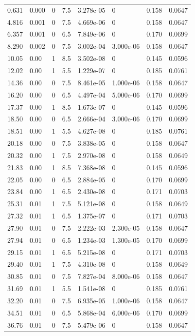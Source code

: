 \documentclass[preview]{standalone}
\begin{document}
{{\begin{tabular}{L{1.2cm}C{1.2cm} C{0.3cm}C{0.5cm} C{1.4cm}C{1.4cm} C{1.4cm}C{1.4cm}}
  0.631  &  0.000  & 0     & 7.5 &  3.278e-05  & 0  & 0.158 &  0.0647   \\ 
  4.816  &  0.001  & 0     & 7.5 &  4.669e-06  & 0  & 0.158 &  0.0647   \\ 
  6.357  &  0.001  & 0     & 6.5 &  7.849e-06  & 0  & 0.170 &  0.0699   \\ 
  8.290  &  0.002  & 0     & 7.5 &  3.002e-04  & 3.000e-06  & 0.158 &  0.0647   \\ 
  10.05  &  0.00  & 1     & 8.5 &  3.502e-08  & 0  & 0.145 &  0.0596   \\ 
  12.02  &  0.00  & 1     & 5.5 &  1.229e-07  & 0  & 0.185 &  0.0761   \\ 
  14.36  &  0.00  & 0     & 7.5 &  8.461e-05  & 1.000e-06  & 0.158 &  0.0647   \\ 
  16.20  &  0.00  & 0     & 6.5 &  4.497e-04  & 5.000e-06  & 0.170 &  0.0699   \\ 
  17.37  &  0.00  & 1     & 8.5 &  1.673e-07  & 0  & 0.145 &  0.0596   \\ 
  18.50  &  0.00  & 0     & 6.5 &  2.666e-04  & 3.000e-06  & 0.170 &  0.0699   \\ 
  18.51  &  0.00  & 1     & 5.5 &  4.627e-08  & 0  & 0.185 &  0.0761   \\ 
  20.18  &  0.00  & 0     & 7.5 &  3.838e-05  & 0  & 0.158 &  0.0647   \\ 
  20.32  &  0.00  & 1     & 7.5 &  2.970e-08  & 0  & 0.158 &  0.0649   \\ 
  21.83  &  0.00  & 1     & 8.5 &  7.368e-08  & 0  & 0.145 &  0.0596   \\ 
  22.05  &  0.00  & 0     & 6.5 &  2.884e-05  & 0  & 0.170 &  0.0699   \\ 
  23.84  &  0.00  & 1     & 6.5 &  2.430e-08  & 0  & 0.171 &  0.0703   \\ 
  25.31  &  0.01  & 1     & 7.5 &  5.121e-08  & 0  & 0.158 &  0.0649   \\ 
  27.32  &  0.01  & 1     & 6.5 &  1.375e-07  & 0  & 0.171 &  0.0703   \\ 
  27.90  &  0.01  & 0     & 7.5 &  2.222e-03  & 2.300e-05  & 0.158 &  0.0647   \\ 
  27.94  &  0.01  & 0     & 6.5 &  1.234e-03  & 1.300e-05  & 0.170 &  0.0699   \\ 
  29.15  &  0.01  & 1     & 6.5 &  5.215e-08  & 0  & 0.171 &  0.0703   \\ 
  29.40  &  0.01  & 1     & 7.5 &  4.310e-08  & 0  & 0.158 &  0.0649   \\ 
  30.85  &  0.01  & 0     & 7.5 &  7.827e-04  & 8.000e-06  & 0.158 &  0.0647   \\ 
  31.69  &  0.01  & 1     & 5.5 &  1.541e-08  & 0  & 0.185 &  0.0761   \\ 
  32.20  &  0.01  & 0     & 7.5 &  6.935e-05  & 1.000e-06  & 0.158 &  0.0647   \\ 
  34.51  &  0.01  & 0     & 6.5 &  5.868e-04  & 6.000e-06  & 0.170 &  0.0699   \\ 
  36.76  &  0.01  & 0     & 7.5 &  5.479e-06  & 0  & 0.158 &  0.0647   \\ 
\hline 
\end{tabular} 

}}
\end{document}

